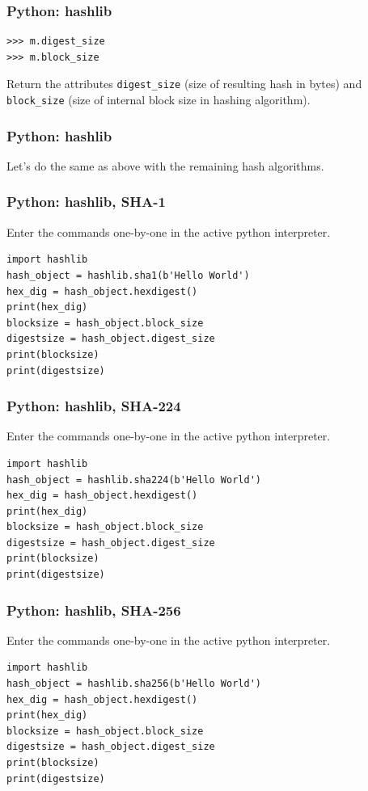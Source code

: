 \documentclass{beamer}
\newcommand{\<}{\langle}
\renewcommand{\>}{\rangle}
\begin{document}
\begin{frame}[fragile]
\frametitle{Python: hashlib}

\begin{verbatim}
>>> m.digest_size
>>> m.block_size
\end{verbatim}

Return the attributes \verb|digest_size| (size of resulting hash in bytes) and \verb|block_size| (size of internal block size in hashing algorithm).
\end{frame}

\begin{frame}
\frametitle{Python: hashlib}

Let's do the same as above with the remaining hash algorithms.
\end{frame}


\begin{frame}[fragile]
\frametitle{Python: hashlib, SHA-1}

 Enter the commands one-by-one in the active python interpreter. 
\begin{verbatim}
import hashlib
hash_object = hashlib.sha1(b'Hello World')
hex_dig = hash_object.hexdigest()
print(hex_dig)
blocksize = hash_object.block_size
digestsize = hash_object.digest_size
print(blocksize)
print(digestsize)
\end{verbatim}
\end{frame}



\begin{frame}[fragile]
\frametitle{Python: hashlib, SHA-224}
 Enter the commands one-by-one in the active python interpreter. 
\begin{verbatim}
import hashlib
hash_object = hashlib.sha224(b'Hello World')
hex_dig = hash_object.hexdigest()
print(hex_dig)
blocksize = hash_object.block_size
digestsize = hash_object.digest_size
print(blocksize)
print(digestsize)
\end{verbatim}
\end{frame}


\begin{frame}[fragile]
\frametitle{Python: hashlib, SHA-256}
 Enter the commands one-by-one in the active python interpreter. 
\begin{verbatim}
import hashlib
hash_object = hashlib.sha256(b'Hello World')
hex_dig = hash_object.hexdigest()
print(hex_dig)
blocksize = hash_object.block_size
digestsize = hash_object.digest_size
print(blocksize)
print(digestsize)
\end{verbatim}
\end{frame}
\end{document}
